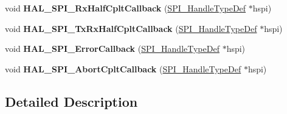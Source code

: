 \begin{DoxyCompactItemize}
\item 
\mbox{\label{group___s_p_i___exported___functions___group2_gacf622756a3814edfacf449b5749b048a}} 
void {\bfseries H\+A\+L\+\_\+\+S\+P\+I\+\_\+\+Rx\+Half\+Cplt\+Callback} (\mbox{\hyperlink{group___s_p_i___exported___types_gab3bd115785297692c125528b7293566b}{S\+P\+I\+\_\+\+Handle\+Type\+Def}} $\ast$hspi)
\item 
\mbox{\label{group___s_p_i___exported___functions___group2_gab46e2325b0880d5b5a301792438b151b}} 
void {\bfseries H\+A\+L\+\_\+\+S\+P\+I\+\_\+\+Tx\+Rx\+Half\+Cplt\+Callback} (\mbox{\hyperlink{group___s_p_i___exported___types_gab3bd115785297692c125528b7293566b}{S\+P\+I\+\_\+\+Handle\+Type\+Def}} $\ast$hspi)
\item 
\mbox{\label{group___s_p_i___exported___functions___group2_ga3db7835e7e7ac335887f62fedf156926}} 
void {\bfseries H\+A\+L\+\_\+\+S\+P\+I\+\_\+\+Error\+Callback} (\mbox{\hyperlink{group___s_p_i___exported___types_gab3bd115785297692c125528b7293566b}{S\+P\+I\+\_\+\+Handle\+Type\+Def}} $\ast$hspi)
\item 
\mbox{\label{group___s_p_i___exported___functions___group2_ga4a2593ec36fa4def11929e65f631f3cf}} 
void {\bfseries H\+A\+L\+\_\+\+S\+P\+I\+\_\+\+Abort\+Cplt\+Callback} (\mbox{\hyperlink{group___s_p_i___exported___types_gab3bd115785297692c125528b7293566b}{S\+P\+I\+\_\+\+Handle\+Type\+Def}} $\ast$hspi)
\end{DoxyCompactItemize}


\subsection{Detailed Description}
